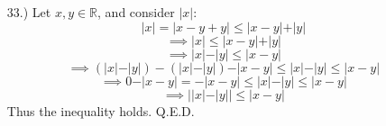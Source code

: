 \documentclass[12pt]{article}
\begin{document}
\begin{itemize}
\begin{itemize}
        \item [b.)] ***
    \end{itemize}



    \item [33.)] Let $x,y\in\mathbb{R}$, and consider $\vert x\vert$:
        \[\vert x\vert=\vert x-y+y\vert\leq\vert x-y\vert+\vert y\vert\]
        \[\implies\vert x\vert\leq\vert x-y\vert+\vert y\vert\]
        \[\implies\vert x\vert-\vert y\vert\leq\vert x-y\vert\]
        \[\implies(\vert x\vert-\vert y\vert)-(\vert x\vert-\vert y\vert)-\vert x-y\vert\leq\vert x\vert-\vert y\vert\leq\vert x-y\vert\]
        \[\implies0-\vert x-y\vert=-\vert x-y\vert\leq\vert x\vert-\vert y\vert\leq\vert x-y\vert\]
        \[\implies\Big\vert\vert x\vert-\vert y\vert\Big\vert\leq\vert x-y\vert\]
        Thus the inequality holds. Q.E.D.





\end{itemize}
\end{document}
